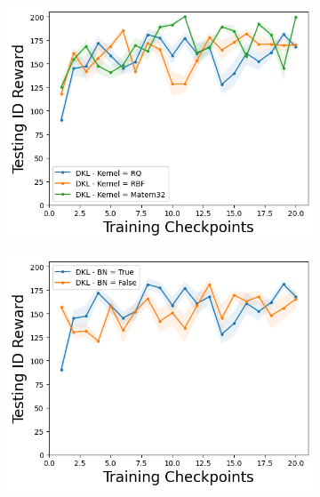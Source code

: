 \begin{figure}
\begin{subfigure}{.245\textwidth}
        \includegraphics[width=\textwidth]{sections/011_icml2022/resources/CartPole-v0-mean_reward_-testing-hyperparameter-kernel-dkl.png}  
    \end{subfigure}
        \begin{subfigure}{.245\textwidth}
        \includegraphics[width=\textwidth]{sections/011_icml2022/resources/CartPole-v0-mean_reward_-testing-hyperparameter-bn-dkl.png}  
    \end{subfigure}
    

\end{figure}
